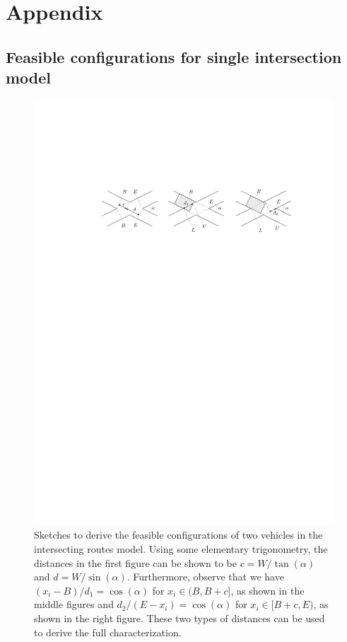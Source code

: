 \documentclass[a4paper]{report}
\theoremstyle{definition}
\theoremstyle{plain}
\newcommand\halfopen[2]{\ensuremath{[#1,#2)}}
\newcommand\openhalf[2]{\ensuremath{(#1,#2]}}
\begin{document}
\part*{Appendix}

\chapter{Feasible configurations for single intersection model}\label{app:configuration-space}

\begin{figure}
  \centering
  \includegraphics[scale=1]{figures/configuration-space}
  \caption{Sketches to derive the feasible configurations of two vehicles in the
    intersecting routes model. Using some elementary trigonometry, the distances
    in the first figure can be shown to be $c = W / \tan(\alpha)$ and
    $d = W / \sin(\alpha)$. Furthermore, observe that we have
    $(x_{i} - B) / d_{1} = \cos(\alpha)$ for
    $x_{i} \in \openhalf{B}{B + c}$, as shown in the middle figures and
    $d_{2}/(E - x_{i}) = \cos(\alpha)$ for $x_{i} \in \halfopen{B + c}{E}$,
    as shown in the right figure. These two types of distances can be used to
    derive the full characterization.}
  \label{fig:configuration-space}
\end{figure}
\end{document}
